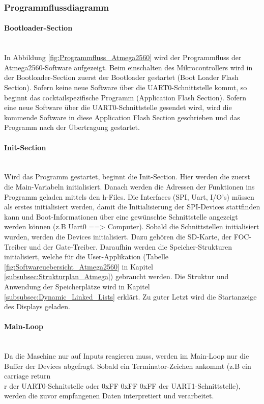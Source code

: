 \subsubsection{Programmflussdiagramm}
\label{subsubsec:Programmflussdiagramm}

\paragraph{Bootloader-Section}\mbox{}\\
In Abbildung \ref{fig:Programmfluss_Atmega2560} wird der Programmfluss der Atmega2560-Software aufgezeigt. Beim einschalten des Mikrocontrollers wird in der Bootloader-Section zuerst der Bootloader gestartet (Boot Loader Flash Section). Sofern keine neue Software über die UART0-Schnittstelle kommt, so beginnt das cocktailspezifische Programm (Application Flash Section). Sofern eine neue Software über die UART0-Schnittstelle gesendet wird, wird die kommende Software in diese Application Flash Section geschrieben und das Programm nach der Übertragung gestartet.

\paragraph{Init-Section}\mbox{}\\
Wird das Programm gestartet, beginnt die Init-Section. Hier werden die zuerst die Main-Variabeln initialisiert. Danach werden die Adressen der Funktionen ins Programm geladen mittels den h-Files. Die Interfaces (SPI, Uart, I/O's) müssen als erstes initialisiert werden, damit die Initialisierung der SPI-Devices stattfinden kann und Boot-Informationen über eine gewünschte Schnittstelle angezeigt werden können (z.B Uart0 ==> Computer). Sobald die Schnittstellen initialisiert wurden, werden die Devices initialisiert. Dazu gehören die SD-Karte, der FOC-Treiber und der Gate-Treiber. Daraufhin werden die Speicher-Strukturen initialisiert, welche für die User-Applikation (Tabelle \ref{fig:Softwareuebersicht_Atmega2560} in Kapitel \ref{subsubsec:Strukturplan_Atmega}) gebraucht werden. Die Struktur und Anwendung der Speicherplätze wird in Kapitel \ref{subsubsec:Dynamic_Linked_Lists} erklärt. Zu guter Letzt wird die Startanzeige des Displays geladen.


\paragraph{Main-Loop}\mbox{}\\
Da die Maschine nur auf Inputs reagieren muss, werden im Main-Loop nur die Buffer der Devices abgefragt. Sobald ein Terminator-Zeichen ankommt (z.B ein carriage return \\r der UART0-Schnitstelle oder 0xFF 0xFF 0xFF der UART1-Schnittstelle), werden die zuvor empfangenen Daten interpretiert und verarbeitet.

